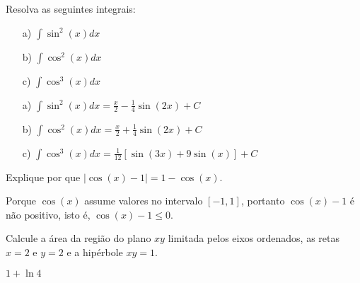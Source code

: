 \begin{exer}Resolva as seguintes integrais:
\begin{itemize}
\item[a)] $\int \sin^2(x)dx$
\item[b)] $\int \cos^2(x)dx$
\item[c)] $\int \cos^3(x)dx$
\end{itemize}
\end{exer}
\begin{resp}
    \begin{itemize}
        \item[a)] $\int \sin^2(x)dx=\frac{x}{2}-\frac{1}{4}\sin(2x)+C$
        \item[b)] $\int \cos^2(x)dx=\frac{x}{2}+\frac{1}{4}\sin(2x)+C$
        \item[c)] $\int \cos^3(x)dx=\frac{1}{12}\left[\sin(3x)+9\sin(x)\right]+C$
 \end{itemize}
        
\end{resp}

\begin{exer} Explique por que $|\cos(x)-1|=1-\cos(x)$.
\end{exer}
\begin{resp}
Porque $\cos(x)$ assume valores no intervalo $[-1,1]$, portanto $\cos(x)-1$ é não positivo, isto é, $\cos(x)-1\leq 0$.
\end{resp}


\begin{exer}Calcule a área da região do plano $xy$ limitada pelos eixos ordenados, as retas $x=2$ e $y=2$ e a hipérbole $xy=1$.
\end{exer}
\begin{resp}
$1+\ln4$ 
\end{resp}




